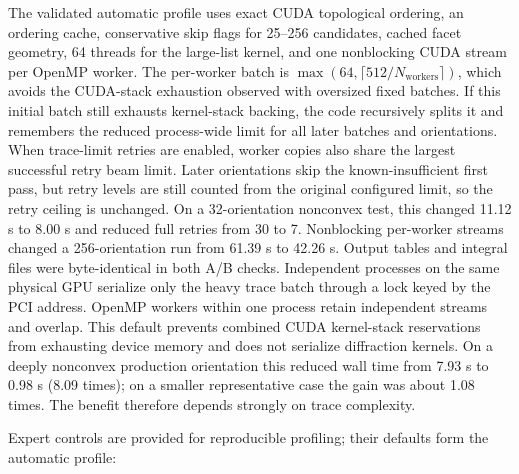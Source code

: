 \documentclass[
  10pt,
  a4paper,
]{article}
\begin{document}
The validated automatic profile uses exact CUDA topological ordering, an
ordering cache, conservative skip flags for 25--256 candidates, cached facet
geometry, 64 threads for the large-list kernel, and one nonblocking CUDA stream
per OpenMP worker. The per-worker batch is
\(
  \max(64,\lceil512/N_{\mathrm{workers}}\rceil)
\),
which avoids the CUDA-stack exhaustion observed with oversized fixed batches.
If this initial batch still exhausts kernel-stack backing, the code recursively
splits it and remembers the reduced process-wide limit for all later batches
and orientations.
When trace-limit retries are enabled, worker copies also share the largest
successful retry beam limit. Later orientations skip the known-insufficient
first pass, but retry levels are still counted from the original configured
limit, so the retry ceiling is unchanged. On a 32-orientation nonconvex test,
this changed 11.12 s to 8.00 s and reduced full retries from 30 to 7.
Nonblocking per-worker streams changed a 256-orientation run from 61.39 s to
42.26 s. Output tables and integral files were byte-identical in both A/B
checks.
Independent processes on the same physical GPU serialize only the heavy trace
batch through a lock keyed by the PCI address. OpenMP workers within one
process retain independent streams and overlap. This default prevents combined
CUDA kernel-stack reservations from exhausting device memory and does not
serialize diffraction kernels.
On a deeply nonconvex production orientation this reduced wall time from
7.93 s to 0.98 s (8.09 times); on a smaller representative case the gain was
about 1.08 times. The benefit therefore depends strongly on trace complexity.

Expert controls are provided for reproducible profiling; their defaults form
the automatic profile:
\end{document}
